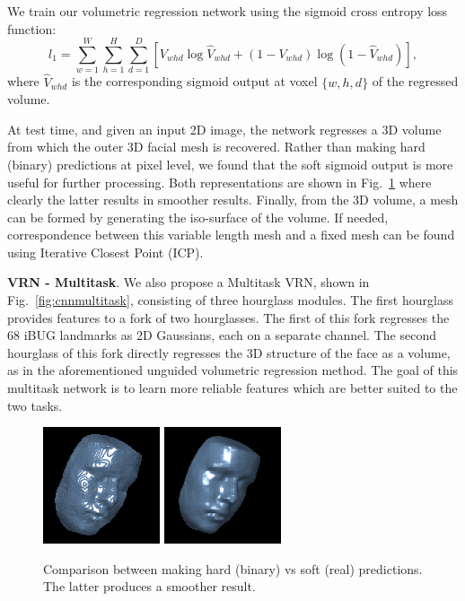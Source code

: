 We train our volumetric regression network using the sigmoid cross entropy loss function:
\begin{equation}
  l_{1} = \sum\limits_{w=1}^{W} \sum\limits_{h=1}^{H}\sum\limits_{d=1}^{D}[V_{whd}\log \widehat{V}_{whd}+(1-V_{whd})\log(1-\widehat{V}_{whd})],
\end{equation}
where $\widehat{V}_{whd}$ is the corresponding sigmoid output at voxel $\{w,h,d\}$ of the regressed volume.

At test time, and given an input 2D image, the network regresses a 3D volume from which the outer 3D facial mesh is recovered. Rather than making hard (binary) predictions at pixel level, we found that the soft sigmoid output is more useful for further processing. Both
representations are shown in Fig.~\ref{fig:roughvssmooth} where
clearly the latter results in smoother results. Finally, from the 3D volume, a mesh can be formed by generating the iso-surface of the volume. If needed, correspondence between this variable length mesh and a fixed mesh can be found using Iterative Closest Point (ICP).

\textbf{VRN - Multitask}. We also propose a Multitask VRN, shown in Fig.~\ref{fig:cnnmultitask}, consisting of three hourglass modules. The first hourglass provides features to a fork of two hourglasses. The first of this fork regresses the 68 iBUG landmarks \cite{sagonas2013semi} as 2D Gaussians, each on a separate channel. The second hourglass of this fork directly regresses the 3D structure of the face as a volume, as in the aforementioned
unguided volumetric regression method. The goal of this multitask network is to learn more reliable features which are better suited to the two tasks.


\begin{figure}
  \centering
  \includegraphics[width=0.4\linewidth]{img/example_rough.png}
  \includegraphics[width=0.4\linewidth]{img/example_smooth.png}
  \caption{Comparison between making hard (binary) vs soft (real) predictions. The latter produces a smoother result.}
  \label{fig:roughvssmooth}
  \vspace{-4mm}
\end{figure}

